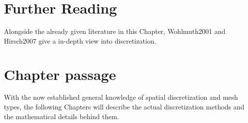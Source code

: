 \section{Further Reading}
Alongside the already given literature in this Chapter, Wohlmuth2001 and Hirsch2007 give a in-depth view into discretization.

\section{Chapter passage}
With the now established general knowledge of spatial discretization and mesh types, the following Chapters
will describe the actual discretization methods and the mathematical details behind them.